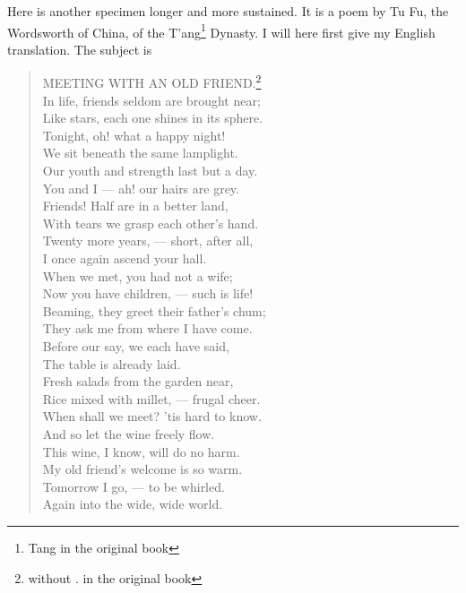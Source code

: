 Here is another specimen longer and more sustained.
It is a poem by Tu Fu,  the Wordsworth of China, of the T'ang\footnote{Tang in the original book} Dynasty.
I will here first give my English translation.
The subject is
\begin{quote}\footnotesize
    MEETING WITH AN OLD FRIEND.\footnote{without . in the original book} \\
   In life, friends seldom are brought near; \\
   Like stars, each one shines in its sphere. \\
   Tonight, oh! what a happy night! \\
   We sit beneath the same lamplight. \\
   Our youth and strength last but a day. \\
   You and I --- ah! our hairs are grey. \\
   Friends! Half are in a better land, \\
   With tears we grasp each other's hand. \\
   Twenty more years, --- short, after all, \\
   I once again ascend your hall. \\
   When we met, you had not a wife; \\
   Now you have children, --- such is life! \\
   Beaming, they greet their father's chum; \\
   They ask me from where I have come. \\
   Before our say, we each have said, \\
   The table is already laid. \\
   Fresh salads from the garden near, \\
   Rice mixed with millet, --- frugal cheer. \\
   When shall we meet? 'tis hard to know. \\
   And so let the wine freely flow. \\
   This wine, I know, will do no harm. \\
   My old friend's welcome is so warm. \\
   Tomorrow I go, --- to be whirled. \\
   Again into the wide, wide world.
\end{quote}

